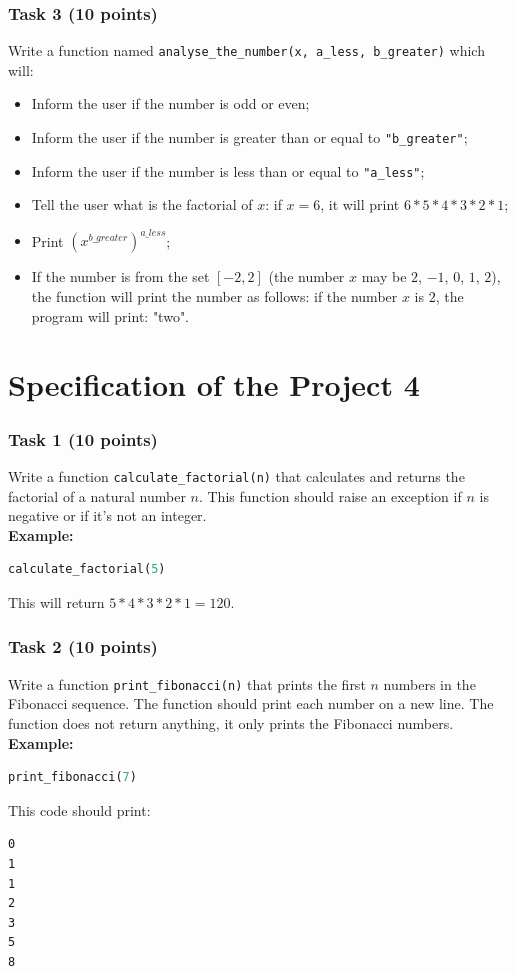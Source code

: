 \documentclass[12pt]{book}
\begin{document}
\subsubsection{Task 3 (10 points)}
Write a function named \texttt{analyse\_the\_number(x, a\_less, b\_greater)} which will:
\begin{itemize}
\item Inform the user if the number is odd or even;
\item Inform the user if the number is greater than or equal to \texttt{"b\_greater"};
\item Inform the user if the number is less than or equal to \texttt{"a\_less"};
\item Tell the user what is the factorial of $x$: if $x = 6$, it will print $6*5*4*3*2*1$;
\item Print $(x^{b\_greater})^{a\_less}$;
\item If the number is from the set $[-2, 2]$ (the number $x$ may be $2$, $-1$, $0$, $1$, $2$), the function will print the number as follows: if the number $x$ is $2$, the program will print: "two".
\end{itemize}

\section{Specification of the Project 4}

\subsubsection{Task 1 (10 points)}
Write a function \texttt{calculate\_factorial(n)} that calculates and returns the factorial of a natural number $n$. This function should raise an exception if $n$ is negative or if it's not an integer. \\
\textbf{Example:}
\begin{lstlisting}[language=Python]
calculate_factorial(5)
\end{lstlisting}
This will return $5*4*3*2*1 = 120$.

\subsubsection{Task 2 (10 points)}
Write a function \texttt{print\_fibonacci(n)} that prints the first $n$ numbers in the Fibonacci sequence. The function should print each number on a new line. The function does not return anything, it only prints the Fibonacci numbers. \\
\textbf{Example:}
\begin{lstlisting}[language=Python]
print_fibonacci(7)
\end{lstlisting}
This code should print:
\begin{verbatim}
0
1
1
2
3
5
8
\end{verbatim}
\end{document}
